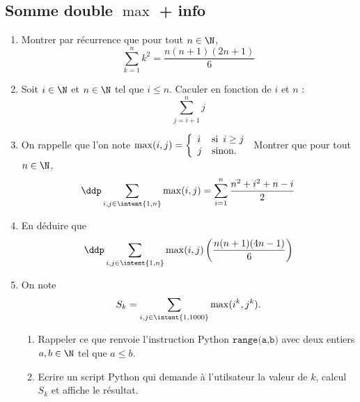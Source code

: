 
\subsection{Somme double $\max$ + info}

\begin{exercice}
\begin{enumerate}
\item Montrer par récurrence que pour tout $n\in \N$, 
$$ \sum_{k=1}^n  k^2= \frac{n(n+1)(2n+1)}{6}$$

\item Soit $i\in \N$ et $n\in \N$ tel que $i\leq n$. Caculer en fonction de $i$ et $n$ :
$$\sum_{j=i+1}^n j$$

\item 
On rappelle que l'on note $\max(i,j) =  \left\{
    \begin{array}{ll}
       i & \text{si\, } i \geq j \\
        j & \mbox{sinon.}
    \end{array}
\right.
$
Montrer que pour tout $n\in \N$, $$\ddp \sum_{i,j\in \intent{1,n}} \max(i,j)  = \sum_{i=1}^n \frac{n^2+i^2 +n-i}{2}$$ 
\item En déduire que 
$$\ddp \sum_{i,j\in \intent{1,n}} \max(i,j) \left(   \frac{n(n+1)(4n-1)}{6} \right)	 $$

\item On note $$S_k =  \sum_{i,j\in \intent{1,1000}} \max(i^k,j^k).$$ 
\begin{enumerate}
\item Rappeler ce que renvoie l'instruction Python $\texttt{range(a,b)}$ avec deux entiers $a,b\in \N$ tel que $a\leq b$.
\item Ecrire un script Python qui demande à l'utilsateur la valeur de $k$, calcul $S_k$ et affiche le résultat. 
\end{enumerate}
\end{enumerate}
\end{exercice}




